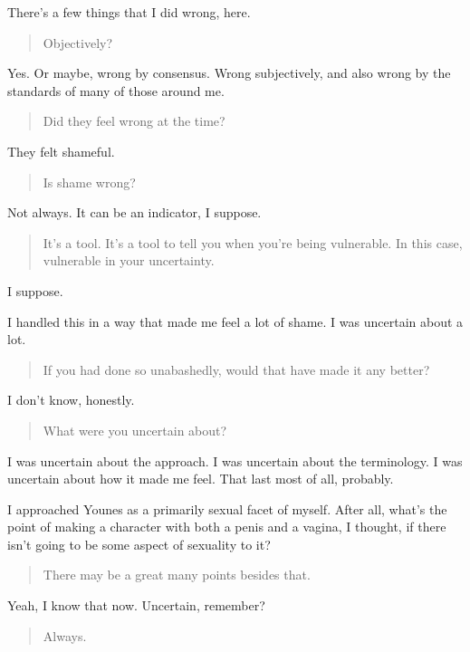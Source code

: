 There's a few things that I did wrong, here.

\begin{quote}
Objectively?
\end{quote}

Yes. Or maybe, wrong by consensus. Wrong subjectively, and also wrong by the standards of many of those around me.

\begin{quote}
Did they feel wrong at the time?
\end{quote}

They felt shameful.

\begin{quote}
Is shame wrong?
\end{quote}

Not always. It can be an indicator, I suppose.

\begin{quote}
It's a tool. It's a tool to tell you when you're being vulnerable. In this case, vulnerable in your uncertainty.
\end{quote}

I suppose.

I handled this in a way that made me feel a lot of shame. I was uncertain about a lot.

\begin{quote}
If you had done so unabashedly, would that have made it any better?
\end{quote}

I don't know, honestly.

\begin{quote}
What were you uncertain about?
\end{quote}

I was uncertain about the approach. I was uncertain about the terminology. I was uncertain about how it made me feel. That last most of all, probably.

I approached Younes as a primarily sexual facet of myself. After all, what's the point of making a character with both a penis and a vagina, I thought, if there isn't going to be some aspect of sexuality to it?

\begin{quote}
There may be a great many points besides that.
\end{quote}

Yeah, I know that now. Uncertain, remember?

\begin{quote}
Always.
\end{quote}

